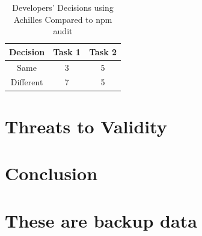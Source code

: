 \documentclass[conference]{IEEEtran}
\begin{document}
\begin{table}[tb]
	\centering
	\caption{Developers' Decisions using Achilles Compared to npm audit}
	\begin{tabular}{ccc} 
		\toprule
		Decision & Task 1 & Task 2 \\
		\midrule
		Same & 3 & 5\\ 
		Different & 7 & 5 \\
		\bottomrule
	\end{tabular}
	\label{table:x3}
\end{table}
	
\section{Threats to Validity}

\section{Conclusion}
	
	
	
	
\clearpage

\section{These are backup data}
	
\end{document}
